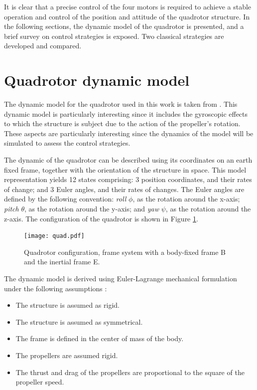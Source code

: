 \documentclass[12pt]{article}
\begin{document}
It is clear that a precise control of the four motors is required to achieve a stable operation and control of the position and attitude of the quadrotor structure. In the following sections, the dynamic model of the quadrotor is presented, and a brief survey on control strategies is exposed. Two classical strategies are developed and compared.

\section{Quadrotor dynamic model}
\label{sec:dynamics}
The dynamic model for the quadrotor used in this work is taken from \cite{Boua04}. This dynamic model is particularly interesting since it includes the gyroscopic effects to which the structure is subject due to the action of the propeller's rotation. These aspects are particularly interesting since the dynamics of the model will be simulated to assess the control strategies.

The dynamic of the quadrotor can be described using its coordinates on an earth fixed frame, together with the orientation of the structure in space. This model representation yields 12 states comprising: 3 position coordinates, and their rates of change; and 3 Euler angles, and their rates of changes. The Euler angles are defined by the following convention: \emph{roll} $\phi$, as the rotation around the x-axis; \emph{pitch} $\theta$, as the rotation around the y-axis; and \emph{yaw} $\psi$, as the rotation around the z-axis. The configuration of the quadrotor is shown in Figure \ref{fig:quad}.

\begin{figure}
  \centering
  \texttt{[image: quad.pdf]}
  \caption{Quadrotor configuration, frame system with a body-fixed frame B and the inertial frame E. \cite{Boua04}}
  \label{fig:quad}
\end{figure}

The dynamic model is derived using Euler-Lagrange mechanical formulation under the following assumptions \cite{Boua04}:

\begin{itemize}
\item The structure is assumed as rigid.
\item The structure is assumed as symmetrical.
\item The 
 frame is defined in the center of mass of the body.
\item The propellers are assumed rigid.
\item The thrust and drag of the propellers are proportional to the square of the propeller speed.
\end{itemize}
\end{document}
